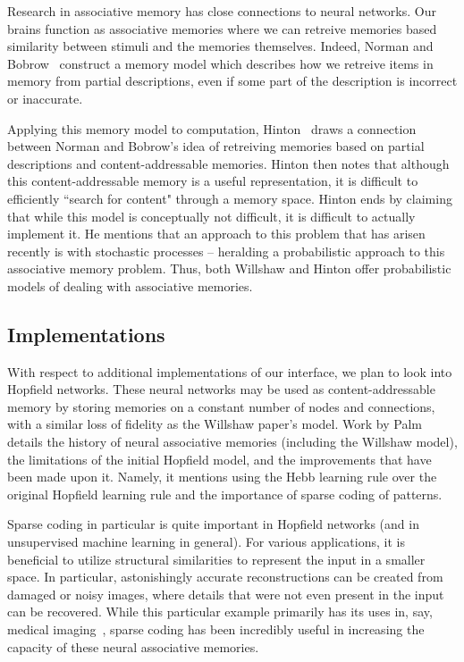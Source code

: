 \documentclass{sig-alternate}
\begin{document}
Research in associative memory has close connections to neural networks. Our brains function as 
associative memories where we can retreive memories based similarity between stimuli and the memories themselves. 
Indeed, Norman and Bobrow~\cite{bobrow} construct a memory model which describes how we retreive 
items in memory from partial descriptions, even if some part of the description is incorrect or inaccurate. 

Applying this memory model to computation, Hinton~\cite{hinton} draws a connection between Norman and Bobrow's idea of 
retreiving memories based on partial descriptions and content-addressable memories.
Hinton then notes that although this content-addressable memory is a useful representation,  
it is difficult to efficiently ``search for content" through a memory space. 
Hinton ends by claiming that while this model is conceptually not difficult, it is difficult to actually 
implement it. He mentions that an approach to this problem that has arisen recently is with stochastic processes 
-- heralding a probabilistic approach to this associative memory problem. Thus, both Willshaw and Hinton offer probabilistic models
of dealing with associative memories.

\subsection{Implementations}
\label{subsec:implementations}

With respect to additional implementations of our interface, we plan to look into 
Hopfield networks. These neural networks may be used as content-addressable memory by
storing memories on a constant number of nodes and connections, with a similar loss of 
fidelity as the Willshaw paper's model. Work by Palm~\cite{palm} details the history of 
neural associative memories (including the Willshaw model), the limitations of the initial Hopfield model, and the improvements
that have been made upon it. Namely, it mentions using the Hebb learning rule over the original
Hopfield learning rule and the importance of sparse coding of patterns. 

Sparse coding in particular is quite important in Hopfield networks (and in unsupervised
machine learning in general). For various applications, it is beneficial to utilize
structural similarities to represent the input in a smaller space. In particular, astonishingly
accurate reconstructions can be created from damaged or noisy images, where details that were 
not even present in the input can be recovered. While this particular example primarily has its uses in, say, 
medical imaging~\cite{yang}, sparse coding has been incredibly useful in increasing the
capacity of these neural associative memories. 
\end{document}
